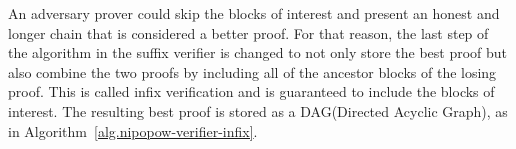 



An adversary prover could skip the blocks of interest and present an honest and
longer chain that is considered a better proof. For that reason, the last step
of the algorithm in the suffix verifier is changed to not only store the best
proof but also combine the two proofs by including all of the ancestor blocks
of the losing proof. This is called infix verification and is guaranteed to
include the blocks of interest. The resulting best proof is stored as a
DAG(Directed Acyclic Graph), as in Algorithm~\ref{alg.nipopow-verifier-infix}.


